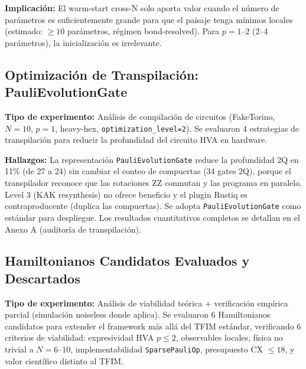 \documentclass[11pt,a4paper,spanish]{book}
\begin{document}
\textbf{Implicación:} El warm-start cross-N solo aporta valor cuando el número de parámetros es suficientemente grande para que el paisaje tenga mínimos locales (estimado: $\geq 10$ parámetros, régimen bond-resolved). Para $p = 1$--$2$ (2--4 parámetros), la inicialización es irrelevante.

\subsection{Optimización de Transpilación: PauliEvolutionGate}

\textbf{Tipo de experimento:} Análisis de compilación de circuitos (FakeTorino, $N = 10$, $p = 1$, heavy-hex, \texttt{optimization\_level=2}). Se evaluaron 4 estrategias de transpilación para reducir la profundidad del circuito HVA en hardware.

\textbf{Hallazgos:} La representación \texttt{PauliEvolutionGate} reduce la profundidad 2Q en 11\% (de 27 a 24) sin cambiar el conteo de compuertas (34 gates 2Q), porque el transpilador reconoce que las rotaciones ZZ conmutan y las programa en paralelo. Level 3 (KAK resynthesis) no ofrece beneficio y el plugin Rustiq es contraproducente (duplica las compuertas). Se adopta \texttt{PauliEvolutionGate} como estándar para despliegue. Los resultados cuantitativos completos se detallan en el Anexo A (auditoría de transpilación).

\subsection{Hamiltonianos Candidatos Evaluados y Descartados}

\textbf{Tipo de experimento:} Análisis de viabilidad teórica + verificación empírica parcial (simulación noiseless donde aplica). Se evaluaron 6 Hamiltonianos candidatos para extender el framework más allá del TFIM estándar, verificando 6 criterios de viabilidad: expresividad HVA $p \leq 2$, observables locales, física no trivial a $N = 6$--$10$, implementabilidad \texttt{SparsePauliOp}, presupuesto CX $\leq 18$, y valor científico distinto al TFIM.
\end{document}
